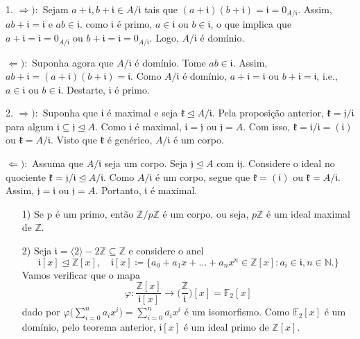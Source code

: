 \documentclass[algebraII_notes.tex]{subfiles}
\begin{document}
\begin{proof*}
	1. \(\Rightarrow ):\) Sejam \(a+\mathfrak{i}, b+\mathfrak{i}\in A/\mathfrak{i}\) tais que \((a+\mathfrak{i})(b+\mathfrak{i})=\mathfrak{i}=0_{A/\mathfrak{i}}.\) Assim,
	\(ab+\mathfrak{i} = \mathfrak{i}\) e \(ab\in \mathfrak{i}.\) como \(\mathfrak{i}\) é primo, \(a\in \mathfrak{i}\) ou \(b\in \mathfrak{i}\), o que implica que
	\(a+\mathfrak{i} = \mathfrak{i} = 0_{A/\mathfrak{i}}\) ou \(b+\mathfrak{i} = \mathfrak{i} = 0_{A/\mathfrak{i}}.\) Logo, \(A/\mathfrak{i}\) é domínio.

	\(\Leftarrow ):\) Suponha agora que \(A/\mathfrak{i}\) é domínio. Tome \(ab\in \mathfrak{i}\). Assim, \(ab + \mathfrak{i} = (a+\mathfrak{i})(b+\mathfrak{i}) = \mathfrak{i}.\)
	Como \(A/\mathfrak{i}\) é domínio, \(a+\mathfrak{i} = \mathfrak{i}\) ou \(b+\mathfrak{i} = \mathfrak{i}\), i.e., \(a\in \mathfrak{i}\) ou \(b\in \mathfrak{i}.\) Destarte, \(\mathfrak{i}\) é primo.

	2. \(\Rightarrow ):\) Suponha que \(\mathfrak{i}\) é maximal e seja \(\mathfrak{k}\trianglelefteq{A/\mathfrak{i}}.\) Pela proposição anterior,
	\(\mathfrak{k} = \mathfrak{j}/\mathfrak{i}\) para algum \(\mathfrak{i}\subseteq \mathfrak{j}\trianglelefteq{A}.\) Como \(\mathfrak{i}\) é maximal,
	\(\mathfrak{i}=\mathfrak{j}\) ou \(\mathfrak{j} = A.\) Com isso, \(\mathfrak{k} = \mathfrak{i}/\mathfrak{i} = (\mathfrak{i})\) ou \(\mathfrak{k} = A/\mathfrak{i}.\)
	Visto que \(\mathfrak{k}\) é genérico, \(A/\mathfrak{i}\) é um corpo.

	\(\Leftarrow ):\) Assuma que \(A/\mathfrak{i}\) seja um corpo. Seja \(\mathfrak{j}\trianglelefteq{A}\) com \(\mathfrak{i}\mathfrak{j}\).
	Considere o ideal no quociente \(\mathfrak{k} = \mathfrak{j}/\mathfrak{i}\trianglelefteq{A/\mathfrak{i}}\). Como \(A/\mathfrak{i}\) é um corpo,
	segue que \(\mathfrak{k} = (\mathfrak{i})\) ou \(\mathfrak{k} = A/\mathfrak{i}.\) Assim, \(\mathfrak{j} = \mathfrak{i}\) ou \(\mathfrak{j} = A.\)
	Portanto, \(\mathfrak{i}\) é maximal. \qedsymbol
\end{proof*}
\begin{example}
	\begin{itemize}
		\item[1)] Se p é um primo, então \(\mathbb{Z}/p \mathbb{Z}\) é um corpo, ou seja, \(p \mathbb{Z}\) é um ideal maximal de \(\mathbb{Z}.\)
		\item[2)] Seja \(\mathfrak{i} = \langle 2 \rangle - 2 \mathbb{Z}\subseteq \mathbb{Z}\) e considere o anel
		      \[
			      \mathfrak{i}[x] \trianglelefteq \mathbb{Z}[x],\quad  \mathfrak{i}[x]\coloneqq \{a_{0}+a_{1}x+\dotsc +a_{n}x^{n}\in \mathbb{Z}[x]: a_{i}\in \mathfrak{i}, n\in \mathbb{N}.\}
		      \]
		      Vamos verificar que o mapa
		      \[
			      \varphi : \frac{\mathbb{Z}[x]}{\mathfrak{i}[x]}\rightarrow \biggl(\frac{\mathbb{Z}}{\mathfrak{i}}\biggr)[x] = \mathbb{F}_{2}[x]
		      \]
		      dado por \(\varphi \biggl(\sum\limits_{i=0}^{n}a_{i}x^{i}\biggr) = \sum\limits_{i=0}^{n}\overline{a_{i}}x^{i}\) é um isomorfismo. Como \(\mathbb{F}_{2}[x]\) é um domínio,
		      pelo teorema anterior, \(\mathfrak{i}[x]\) é um ideal primo de \(\mathbb{Z}[x]\).
	\end{itemize}
\end{example}
\end{document}
